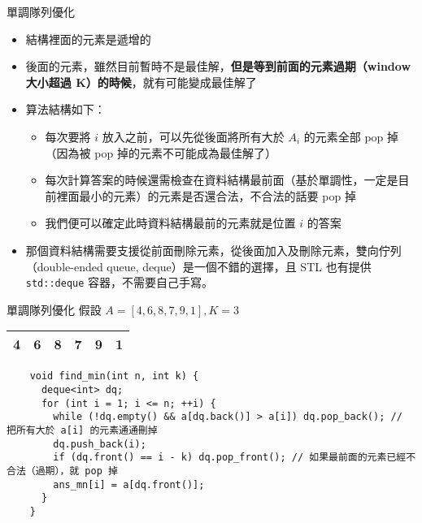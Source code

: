 \documentclass[standalone]{beamer}
\begin{document}
\begin{frame}{單調隊列優化}
  \begin{itemize}
    \item 結構裡面的元素是遞增的
    \item 後面的元素，雖然目前暫時不是最佳解，\textbf{但是等到前面的元素過期（window 大小超過 K）的時候}，就有可能變成最佳解了
    \item 算法結構如下：
    \begin{itemize}
      \item 每次要將 $i$ 放入之前，可以先從後面將所有大於 $A_i$ 的元素全部 pop 掉（因為被 pop 掉的元素不可能成為最佳解了）
      \item 每次計算答案的時候還需檢查在資料結構最前面（基於單調性，一定是目前裡面最小的元素）的元素是否還合法，不合法的話要 pop 掉
      \item 我們便可以確定此時資料結構最前的元素就是位置 $i$ 的答案
    \end{itemize}
    \item 那個資料結構需要支援從前面刪除元素，從後面加入及刪除元素，雙向佇列（double-ended queue, deque）是一個不錯的選擇，且 STL 也有提供 \texttt{std::deque} 容器，不需要自己手寫。
  \end{itemize}
\end{frame}

\begin{frame}{單調隊列優化}
  假設 $A = [4, 6, 8, 7, 9, 1], K = 3$

  \begin{center}
    \begin{tabular}{|p{}|p{}|p{}|p{}|p{}|p{}|}
      \hline
      4 & 6 & 8 & 7 & 9 & 1 \\ [5ex]
      \hline
    \end{tabular}
  \end{center}
\end{frame}


\begin{frame}[fragile]{}
  \begin{verbatim}
    void find_min(int n, int k) {
      deque<int> dq;
      for (int i = 1; i <= n; ++i) {
        while (!dq.empty() && a[dq.back()] > a[i]) dq.pop_back(); // 把所有大於 a[i] 的元素通通刪掉
        dq.push_back(i);
        if (dq.front() == i - k) dq.pop_front(); // 如果最前面的元素已經不合法（過期），就 pop 掉
        ans_mn[i] = a[dq.front()];
      }
    }
  \end{verbatim}
\end{frame}
\end{document}
